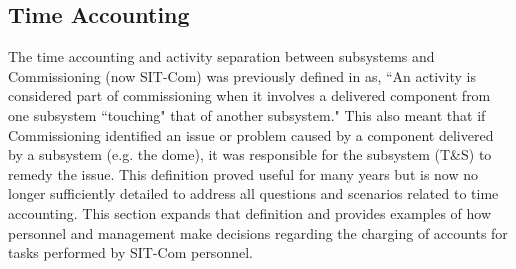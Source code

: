 \documentclass[SE,lsstdraft,authoryear,toc]{lsstdoc}
\begin{document}
%
%


\subsection{Time Accounting}
\label{sec:time}

The time accounting and activity separation between subsystems and Commissioning (now SIT-Com) was previously defined in  as, ``An activity is considered part of commissioning when it involves a delivered component from one subsystem ``touching" that of another subsystem."
This also meant that if Commissioning identified an issue or problem caused by a component delivered by a subsystem (e.g. the dome), it was responsible for the subsystem (T\&S) to remedy the issue.
This definition proved useful for many years but is now no longer sufficiently detailed to address all questions and scenarios related to time accounting.
This section expands that definition and provides examples of how personnel and management make decisions regarding the charging of accounts for tasks performed by SIT-Com personnel.
\end{document}
